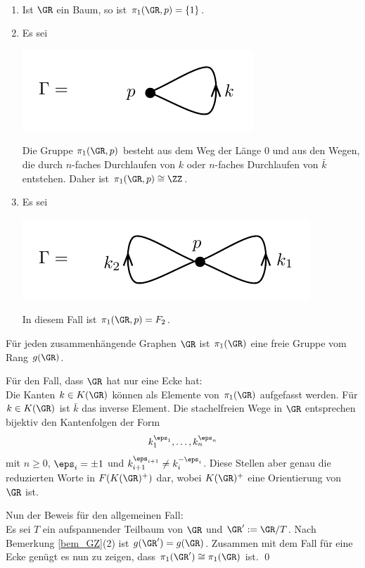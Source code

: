 \BSP\
\begin{enumerate}
\item Ist $\GR$ ein Baum, so ist $\pi_1(\GR,p)=\{1\}$.
\item Es sei
\begin{center}
	\includegraphics{grugraImages/pi1Z}
\end{center}
Die Gruppe $\pi_1(\GR,p)$ besteht aus dem Weg der Länge $0$
und aus den Wegen, die durch
$n$-faches Durchlaufen von $k$ oder $n$-faches Durchlaufen von
$\bar{k}$ entstehen. Daher ist $\pi_1(\GR,p)\cong\ZZ$.
\item Es sei
\begin{center}
	\includegraphics{grugraImages/pi1F2}
\end{center}
In diesem Fall ist $\pi_1(\GR,p)=F_2$.
\end{enumerate}

\PROP\label{prop_zusfrei}
Für jeden zusammenhängende Graphen $\GR$ ist $\pi_1(\GR)$
eine freie Gruppe vom Rang $g(\GR)$.

\bew Für den Fall, dass $\GR$ hat nur eine Ecke hat:\\
Die Kanten $k\in K(\GR)$ können als Elemente von $\pi_1(\GR)$
aufgefasst werden. Für $k\in K(\GR)$ ist $\bar{k}$ das inverse
Element. Die stachelfreien Wege in $\GR$ entsprechen bijektiv
den Kantenfolgen der Form
\[
k_1^{\eps_1},\ldots,k_n^{\eps_n}
\]
mit $n\geq 0$, $\eps_i=\pm 1$ und
$k_{i+1}^{\eps_{i+1}}\neq k_i^{-\eps_i}$.
Diese Stellen aber genau die reduzierten Worte in
$F(K(\GR)^+)$ dar, wobei $K(\GR)^+$ eine Orientierung von
$\GR$ ist.

Nun der Beweis für den allgemeinen Fall:\\
Es sei $T$ ein aufspannender Teilbaum
von $\GR$ und $\GR':=\GR/T$. Nach Bemerkung \ref{bem_GZ}(2) ist
$g(\GR')=g(\GR)$. Zusammen mit dem Fall für eine Ecke genügt es
nun zu zeigen, dass $\pi_1(\GR')\cong\pi_1(\GR)$ ist.
\qed

